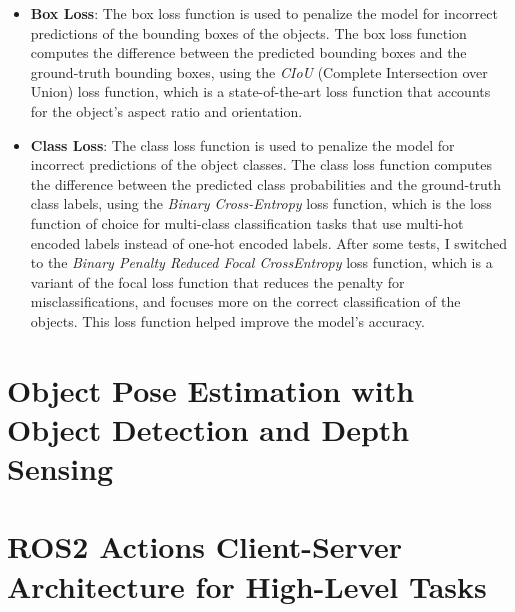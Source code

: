 \begin{itemize}
    \item \textbf{Box Loss}: The box loss function is used to penalize the model for incorrect predictions of the bounding
    boxes of the objects. The box loss function computes the difference between the predicted bounding boxes and the
    ground-truth bounding boxes, using the \textit{CIoU} (Complete Intersection over Union) loss function, which is a
    state-of-the-art loss function that accounts for the object's aspect ratio and orientation.
    \item \textbf{Class Loss}: The class loss function is used to penalize the model for incorrect predictions of the
    object classes. The class loss function computes the difference between the predicted class probabilities and the
    ground-truth class labels, using the \textit{Binary Cross-Entropy} loss function, which is the loss function of
    choice for multi-class classification tasks that use multi-hot encoded labels instead of one-hot encoded labels.
    After some tests, I switched to the \textit{Binary Penalty Reduced Focal CrossEntropy} loss function, which is a variant
    of the focal loss function that reduces the penalty for misclassifications, and focuses more on the correct
    classification of the objects. This loss function helped improve the model's accuracy.
\end{itemize}



\section{Object Pose Estimation with Object Detection and Depth Sensing}

\section{ROS2 Actions Client-Server Architecture for High-Level Tasks}


